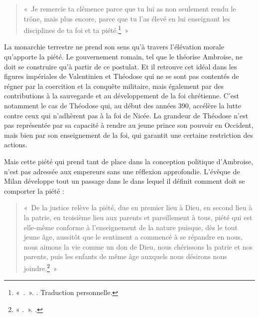 \bigskip

\begin{quote}
    «~Je remercie ta clémence parce que tu lui as non seulement rendu le trône, mais plus encore, parce que tu l’as élevé en lui enseignant les disciplines de ta foi et ta piété.\footnote{«~.~». \cite[, 3]{ambroise_csel_82_1}. Traduction personnelle.}~»
\end{quote}

\bigskip

La monarchie terrestre ne prend son sens qu'à travers l'élévation morale qu'apporte la piété. Le gouvernement romain, tel que le théorise Ambroise, ne doit se construire qu'à partir de ce postulat. Et il retrouve cet idéal dans les figures impériales de Valentinien et Théodose qui ne se sont pas contentés de régner par la coercition et la conquête militaire, mais également par des contributions à la sauvegarde et au développement de la foi chrétienne. C'est notamment le cas de Théodose qui, au début des années 390, accélère la lutte contre ceux qui n'adhèrent pas à la foi de Nicée. La grandeur de Théodose n'est pas représentée par sa capacité à rendre au jeune prince son pouvoir en Occident, mais bien par son enseignement de la foi, qui garantit une certaine restriction des actions.

\bigskip

Mais cette piété qui prend tant de place dans la conception politique d'Ambroise, n'est pas adressée aux empereurs sans une réflexion approfondie. L'évêque de Milan développe tout un passage dans le  dans lequel il définit comment doit se comporter la piété :

\bigskip

\begin{quote}
    «~De la justice relève la piété, due en premier lieu à Dieu, en second lieu à la patrie, en troisième lieu aux parents et pareillement à tous, piété qui est elle-même conforme à l'enseignement de la nature puisque, dès le tout jeune âge, aussitôt que le sentiment a commencé à se répandre en nous, nous aimons la vie comme un don de Dieu, nous chérissons la patrie et nos parents, puis les enfants de même âge auxquels nous désirons nous joindre.\footnote{« .~». \cite[\nopp I, 127]{ambroise_devoirs_1}.}~»
\end{quote}

